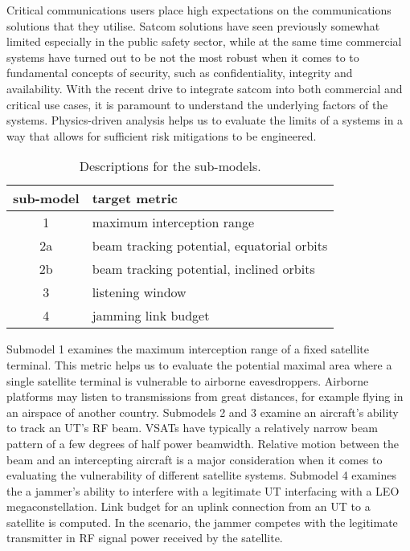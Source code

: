 \documentclass[english, 12pt, a4paper, elec, utf8, a-1b, online]{aaltothesis}
\begin{document}
Critical communications users place high expectations on the communications solutions that they utilise.
Satcom solutions have seen previously somewhat limited especially in the public safety sector, while at the same time commercial systems have turned out to be not the most robust when it comes to to fundamental concepts of security, such as confidentiality, integrity and availability.
With the recent drive to integrate satcom into both commercial and critical use cases, it is paramount to understand the underlying factors of the systems.
Physics-driven analysis helps us to evaluate the limits of a systems in a way that allows for sufficient risk mitigations to be engineered. %

\begin{table}[h]
  \centering
  \caption{Descriptions for the sub-models.}
  \begin{tabular}{@{}cl@{}}
  \toprule
  \multicolumn{1}{l}{sub-model} & target metric                              \\ \midrule
  1                             & maximum interception range                 \\
  2a                            & beam tracking potential, equatorial orbits \\
  2b                            & beam tracking potential, inclined orbits   \\
  3                             & listening window                           \\
  4                             & jamming link budget                        \\ \bottomrule
  \end{tabular}
  \label{table-sub-model-descriptions}
\end{table}

Submodel 1 examines the maximum interception range of a fixed satellite terminal.
This metric helps us to evaluate the potential maximal area where a single satellite terminal is vulnerable to airborne eavesdroppers.
Airborne platforms may listen to transmissions from great distances, for example flying in an airspace of another country.
Submodels 2 and 3 examine an aircraft's ability to track an UT's RF beam.
VSATs have typically a relatively narrow beam pattern of a few degrees of half power beamwidth.
Relative motion between the beam and an intercepting aircraft is a major consideration when it comes to evaluating the vulnerability of different satellite systems.
Submodel 4 examines the a jammer's ability to interfere with a legitimate UT interfacing with a LEO megaconstellation.
Link budget for an uplink connection from an UT to a satellite is computed.
In the scenario, the jammer competes with the legitimate transmitter in RF signal power received by the satellite.
\end{document}
